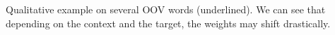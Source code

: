 \documentclass[25pt, a0paper,
               colspace=15mm, subcolspace=0mm,
               blockverticalspace=17mm]{tikzposter} %
\begin{document}
\begin{columns}
{  \vspace{2mm}
  Qualitative example on several OOV words (underlined). We can see that depending on the context and the target, the weights may shift drastically.
  }
  




\end{columns}
\end{document}
